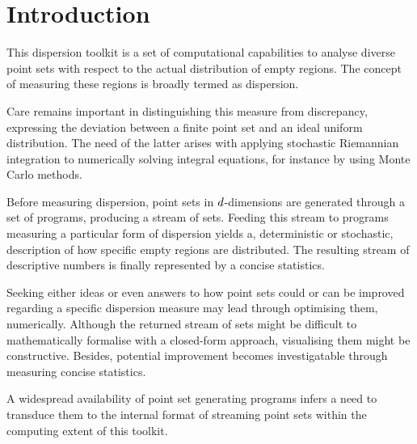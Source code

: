 \chapter{Introduction}

This dispersion toolkit is a set of computational capabilities to analyse diverse  point sets with respect to the actual distribution of empty regions. The concept of measuring these regions is broadly termed as dispersion.

Care remains important in distinguishing this measure from discrepancy, expressing the deviation between a finite point set and an ideal uniform distribution. The need of the latter arises with applying stochastic Riemannian integration to numerically solving integral equations, for instance by using Monte Carlo methods.

Before measuring dispersion, point sets in $d$-dimensions are generated through a set of programs, producing a stream of sets. Feeding this stream to programs measuring a particular form of dispersion yields a, deterministic or stochastic, description of how specific empty regions are distributed. The resulting stream of descriptive numbers is finally represented by a concise statistics.

Seeking either ideas or even answers to how point sets could or can be improved regarding a specific dispersion measure may lead through optimising them, numerically. Although the returned stream of sets might be difficult to mathematically formalise with a closed-form approach, visualising them might be constructive. Besides, potential improvement becomes investigatable through measuring concise statistics.

A widespread availability of point set generating programs infers a need to transduce them to the internal format of streaming point sets within the computing extent of this toolkit.
